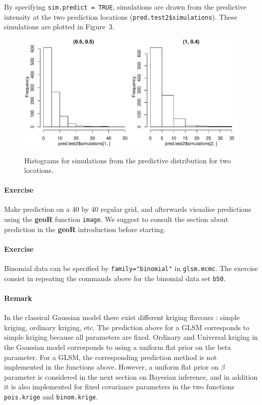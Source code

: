 \documentclass[12pt,a4paper]{article}
\newcommand{\strong}[1]{{\textbf{ #1}}}
\let\pkg=\strong
\newcommand{\code}[1]{\texttt{\small #1}}
\begin{document}
By specifying \code{sim.predict = TRUE}, simulations are drawn from the predictive intensity at the two prediction locations (\code{pred.test2\$simulations}). 
These simulations are plotted in Figure~3. 
\begin{figure}[h!]
\centering
\includegraphics{geoRglmintro-017}
\label{fig:hist.sim.pk}
\caption{Histograms for simulations from the predictive distribution
for two locations.}
\end{figure} 

\paragraph*{Exercise}
Make prediction on a 40 by 40 regular grid, and afterwards visualise
predictions using the \pkg{geoR} function \code{image}. We suggest
to consult the section about prediction in the \pkg{geoR} introduction before starting.

\paragraph*{Exercise}
Binomial data can be specified by
\code{family="binomial"} in \code{glsm.mcmc}. The exercise consist in
repeating the commands above for the binomial data set \code{b50}.

\paragraph*{Remark}
In the classical Gaussian model there exist different kriging
flavours : simple kriging, ordinary kriging, etc. The prediction above
for a GLSM corresponds to simple kriging because all parameters are
fixed. Ordinary and Universal kriging in the Gaussian model
corresponds to using a uniform flat prior on the beta parameter. For a
GLSM, the corresponding prediction method is not implemented in the
functions above. However, a uniform flat prior on $\beta$ parameter is
considered in the next section on Bayesian inference, and in addition
it is also
implemented for fixed covariance parameters in the two functions \code{pois.krige} and \code{binom.krige}. 
\end{document}
